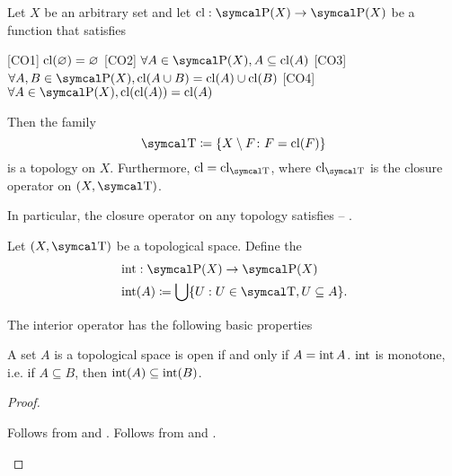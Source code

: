 \begin{proposition}\label{thm:closure_operator_axioms}\cite[14]{Engelking1989}
  Let \( X \) be an arbitrary set and let \( \Cl: \Power(X) \to \Power(X) \) be a function that satisfies
  \begin{description}
    [CO1] \( \operatorname{cl}(\varnothing) = \varnothing \)
    [CO2] \( \forall A \in \Power(X), A \subseteq \Cl(A) \)
    [CO3] \( \forall A, B \in \Power(X), \Cl(A \cup B) = \Cl(A) \cup \Cl(B) \)
    [CO4] \( \forall A \in \Power(X), \Cl(\Cl(A)) = \Cl(A) \)
  \end{description}

  Then the family
  \begin{equation*}
    \CT \coloneqq \{ X \setminus F \colon F = \Cl(F) \}
  \end{equation*}
  is a topology on \( X \). Furthermore, \( \Cl = \Cl_{\CT} \), where \( \Cl_{\CT} \) is the closure operator on \( (X, \CT) \).

  In particular, the closure operator on any topology satisfies  -- .
\end{proposition}

\begin{definition}\label{def:interior_operator}\cite[15]{Engelking1989}
  Let \( (X, \CT) \) be a topological space. Define the 
  \begin{align*}
    &\Int: \Power(X) \to \Power(X) \\
    &\Int(A) \coloneqq \bigcup \{ U : U \in \CT, U \subseteq A \}.
  \end{align*}
\end{definition}

\begin{proposition}\label{thm:interior_operator_properties}
  The interior operator has the following basic properties
  \begin{propenum}
     A set \( A \) is a topological space is open if and only if \( A = \operatorname{int} A \).
     \( \operatorname{int} \) is monotone, i.e. if \( A \subseteq B \), then \( \operatorname{int}(A) \subseteq \operatorname{int}(B) \).
  \end{propenum}
\end{proposition}
\begin{proof}\mbox{}
  \begin{description}
     Follows from  and .
     Follows from  and .
  \end{description}
\end{proof}

